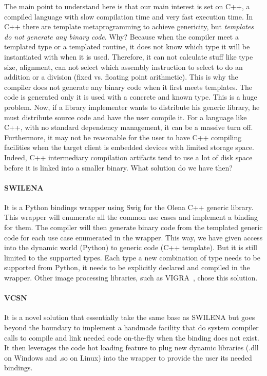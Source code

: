 The main point to understand here is that our main interest is set on C++, a compiled language with slow compilation
time and very fast execution time. In C++ there are template metaprogramming to achieve genericity, but \emph{templates
  do not generate any binary code}. Why? Because when the compiler meet a templated type or a templated routine, it does
not know which type it will be instantiated with when it is used. Therefore, it can not calculate stuff like type size,
alignment, can not select which assembly instruction to select to do an addition or a division (fixed vs. floating
point arithmetic). This is why the compiler does not generate any binary code when it first meets templates. The code is
generated only it is used with a concrete and known type. This is a huge problem. Now, if a library implementer wants to
distribute his generic library, he must distribute source code and have  the user compile it. For a language like C++,
with no standard dependency management, it can be a massive turn off. Furthermore, it may not be reasonable for the user
to have C++ compiling facilities when the target client is embedded devices with limited storage space. Indeed, C++
intermediary compilation artifacts tend to use a lot of disk space before it is linked into a smaller binary. What
solution do we have then?

\paragraph{SWILENA~\parencite{beazley.1996.swig,olena.2000.www}} It is a Python bindings wrapper using Swig for the
Olena C++ generic library. This wrapper will enumerate all the common use cases and implement a binding for them. The
compiler will then generate binary code from the templated generic code for each use case enumerated in the wrapper.
This way, we have given access into the dynamic world (Python) to generic code (C++ template). But it is still limited
to the supported types. Each type a new combination of type needs to be supported from Python, it needs to be explicitly
declared and compiled in the wrapper. Other image processing libraries, such as VIGRA~\parencite{kothe.2011.generic},
chose this solution.

\paragraph{VCSN~\parencite{demaille.2013.vcsn}} It is a novel solution that essentially take the same base as SWILENA
but goes beyond the boundary to implement a handmade facility that do system compiler calls to compile and link needed
code on-the-fly when the binding does not exist. It then leverages the code hot loading feature to plug new dynamic
libraries (.dll on Windows and .so on Linux) into the wrapper to provide the user its needed bindings.

